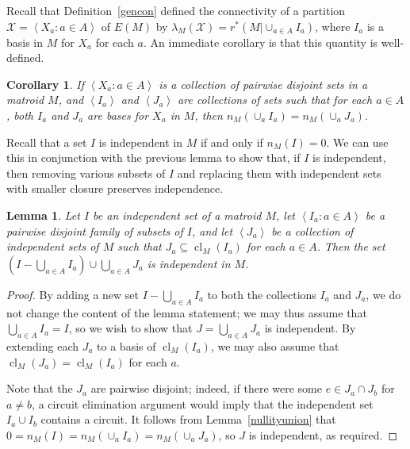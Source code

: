 \documentclass{amsart}
\theoremstyle{plain}
\newtheorem{lemma}[theorem]{Lemma}
\newtheorem{corollary}[theorem]{Corollary}
\theoremstyle{definition}
\newcommand{\cX}{\mathcal{X}}
\DeclareMathOperator{\cl}{cl}
\newcommand{\ab}[1]{\left\langle#1\right\rangle}
\renewcommand{\ss}{\subseteq}
\begin{document}

Recall that Definition~\ref{gencon} defined the connectivity of a partition $\cX = \ab{X_a : a \in A}$ of $E(M)$ by 
$\lambda_M(\cX) = r^*(M | \cup_{a \in A} I_a)$, where $I_a$ is a basis in $M$ for $X_a$ for each $a$. 
An immediate corollary is that this quantity is well-defined. 

\begin{corollary}\label{lambdawelldef}
  If $\ab{X_a : a \in A}$ is a collection of pairwise disjoint sets in a matroid $M$, 
  and $\ab{I_a}$ and $\ab{J_a}$ are collections of sets such that for each $a \in A$,
  both $I_a$ and $J_a$ are bases for $X_a$ in $M$, 
  then $n_M(\cup_a I_a) = n_M(\cup_a J_a)$. 
\end{corollary}

Recall that a set $I$ is independent in $M$ if and only if $n_M(I) = 0$. We can use this in conjunction with the previous lemma 
to show that, if $I$ is independent, then removing various subsets of $I$ and replacing them with independent sets 
with smaller closure preserves independence. 

\begin{lemma}\label{indepclosureswitch}
  Let $I$ be an independent set of a matroid $M$, let $\ab{I_a : a \in A}$ be a pairwise disjoint family of 
  subsets of $I$, and let $\ab{J_a}$ be a collection of independent 
  sets of $M$ such that $J_a \ss \cl_M(I_a)$ for each $a \in A$. 
  Then the set $(I - \bigcup_{a \in A}I_a) \cup \bigcup_{a \in A} J_a$ is independent in $M$. 
\end{lemma}
\begin{proof}
  By adding a new set $I - \bigcup_{a \in A} I_a$ to both the collections $I_a$ and $J_a$, 
  we do not change the content of the lemma statement; we may thus assume that 
  $\bigcup_{a \in A} I_a = I$, so we wish to show that $J = \bigcup_{a \in A} J_a$ is independent. 
  By extending each $J_a$ to a basis of $\cl_M(I_a)$, we may also assume that $\cl_M(J_a) = \cl_M(I_a)$ for each $a$. 
  
  Note that the $J_a$ are pairwise disjoint; indeed, if there were some $e \in J_a \cap J_b$ for $a \ne b$,
  a circuit elimination argument would imply that the independent set $I_a \cup I_b$ contains a circuit. 
  It follows from Lemma~\ref{nullityunion} that $0 = n_M(I) = n_M(\cup_a I_a) = n_M(\cup_a J_a)$, 
  so $J$ is independent, as required. 
\end{proof}
\end{document}
